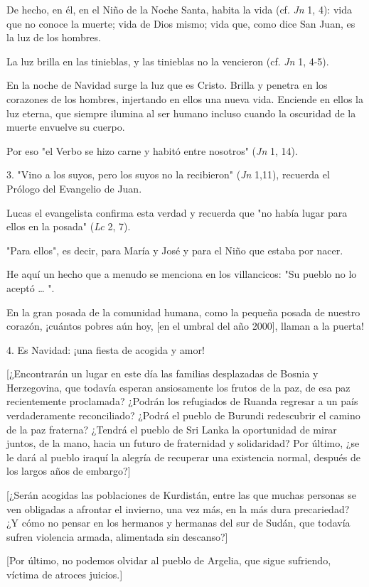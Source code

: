 De hecho, en él, en el Niño de la Noche Santa, habita la vida (cf.
\emph{Jn} 1, 4): vida que no conoce la muerte; vida de Dios mismo; vida
que, como dice San Juan, es la luz de los hombres.

La luz brilla en las tinieblas, y las tinieblas no la vencieron (cf.
\emph{Jn} 1, 4-5).

En la noche de Navidad surge la luz que es Cristo. Brilla y penetra en
los corazones de los hombres, injertando en ellos una nueva vida.
Enciende en ellos la luz eterna, que siempre ilumina al ser humano
incluso cuando la oscuridad de la muerte envuelve su cuerpo.

Por eso "el Verbo se hizo carne y habitó entre nosotros" (\emph{Jn} 1,
14).

3. "Vino a los suyos, pero los suyos no la recibieron" (\emph{Jn} 1,11),
recuerda el Prólogo del Evangelio de Juan.

Lucas el evangelista confirma esta verdad y recuerda que "no había lugar
para ellos en la posada" (\emph{Lc} 2, 7).

"Para ellos", es decir, para María y José y para el Niño que estaba por
nacer.

He aquí un hecho que a menudo se menciona en los villancicos: "Su pueblo
no lo aceptó \ldots{} ".

En la gran posada de la comunidad humana, como la pequeña posada de
nuestro corazón, ¡cuántos pobres aún hoy, {[}en el umbral del año
2000{]}, llaman a la puerta!

4. Es Navidad: ¡una fiesta de acogida y amor!

{[}¿Encontrarán un lugar en este día las familias desplazadas de Bosnia
y Herzegovina, que todavía esperan ansiosamente los frutos de la paz, de
esa paz recientemente proclamada? ¿Podrán los refugiados de Ruanda
regresar a un país verdaderamente reconciliado? ¿Podrá el pueblo de
Burundi redescubrir el camino de la paz fraterna? ¿Tendrá el pueblo de
Sri Lanka la oportunidad de mirar juntos, de la mano, hacia un futuro de
fraternidad y solidaridad? Por último, ¿se le dará al pueblo iraquí la
alegría de recuperar una existencia normal, después de los largos años
de embargo?{]}

{[}¿Serán acogidas las poblaciones de Kurdistán, entre las que muchas
personas se ven obligadas a afrontar el invierno, una vez más, en la más
dura precariedad? ¿Y cómo no pensar en los hermanos y hermanas del sur
de Sudán, que todavía sufren violencia armada, alimentada sin
descanso?{]}

{[}Por último, no podemos olvidar al pueblo de Argelia, que sigue
sufriendo, víctima de atroces juicios.{]}

